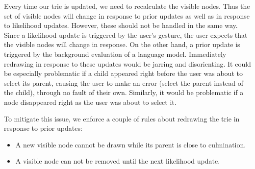 Every time our trie is updated, we need to recalculate the visible nodes.
Thus the set of visible nodes will change in response to prior updates as well
as in response to likelihood updates. However, these should not be handled in the same way.
Since a likelihood update is triggered by the user's gesture, the user expects that the visible nodes
will change in response. On the other hand, a prior update is triggered by the background evaluation of a language model.
Immediately redrawing in response to these updates would be jarring and disorienting.
It could be especially problematic if a child appeared right before the user was about to select its parent, causing
the user to make an error (select the parent instead of the child), through no fault of their own.
Similarly, it would be problematic if a node disappeared right as the user was about to select it.

To mitigate this issue, we enforce a couple of rules about redrawing the trie in response to prior updates:
\begin{itemize}[topsep=2pt]
  \item A new visible node cannot be drawn while its parent is close to culmination.
  \item A visible node can not be removed until the next likelihood update.
\end{itemize}



